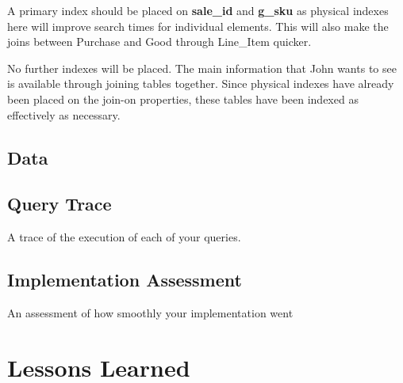 \documentclass[11pt, a4paper]{report}
\begin{document}
A primary index should be placed on \textbf{sale\_id} and \textbf{g\_sku} as physical indexes here will improve search times for individual elements. This will also make the joins between Purchase and Good through Line\_Item quicker.

No further indexes will be placed. The main information that John wants to see is available through joining tables together. Since physical indexes have already been placed on the join-on properties, these tables have been indexed as effectively as necessary.

\clearpage
\section{Data}
    

\clearpage
\section{Query Trace}
    A trace of the execution of each of your queries.

\clearpage
\section{Implementation Assessment}
    An assessment of how smoothly your implementation went

\chapter{Lessons Learned}
\end{document}
